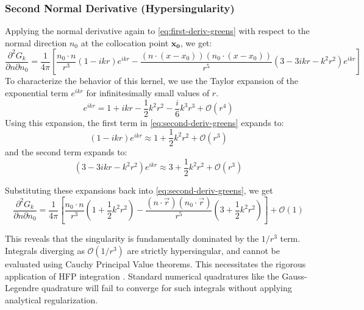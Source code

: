 \subsubsection{Second Normal Derivative (Hypersingularity)} \label{subsubsec:second-normal-derivative}
Applying the normal derivative again to \eqref{eq:first-deriv-greens} with respect to the normal direction $n_0$ at the collocation point $\mathbf{x_0}$, we get:
\begin{equation} \label{eq:second-deriv-greens}
    \frac{\partial^2 G_k}{\partial n \partial n_0} =  \frac{1}{4\pi} \left[\frac{n_0 \cdot n}{r^3}(1 - ikr)e^{ikr} - \frac{(n \cdot (x - x_0))(n_0 \cdot (x - x_0))}{r^5}(3 - 3ikr - k^2 r^2)e^{ikr} \right] 
\end{equation}
To characterize the behavior of this kernel, we use the Taylor expansion of the exponential term $e^{ikr}$ for infinitesimally small values of $r$.
\begin{equation}
    e^{ikr} = 1 + ikr - \frac{1}{2} k^2 r^2 - \frac{i}{6} k^3 r^3 + \mathcal{O}(r^4)
\end{equation}
Using this expansion, the first term in \eqref{eq:second-deriv-greens} expands to:
\begin{equation}
    (1 - ikr)e^{ikr} \approx 1 + \frac{1}{2} k^2 r^2 + \mathcal{O}(r^3)
\end{equation}
and the second term expands to:
\begin{equation}
    (3 - 3ikr - k^2 r^2)e^{ikr} \approx 3 + \frac{1}{2} k^2 r^2 + \mathcal{O}(r^3)
\end{equation}

Substituting these expansions back into \eqref{eq:second-deriv-greens}, we get
\begin{equation}
    \frac{\partial^2 G_k}{\partial n \partial n_0} =  \frac{1}{4\pi} \left[\frac{n_0 \cdot n}{r^3} \left( 1 + \frac{1}{2} k^2 r^2\right) - \frac{(n \cdot \vec{r})(n_0 \cdot \vec{r})}{r^5} \left( 3 + \frac{1}{2} k^2 r^2 \right) \right] + \mathcal{O}(1)
\end{equation} \cite{sunnonsingularburtonmiller2023}

This reveals that the singularity is fundamentally dominated by the $1/r^3$ term.
Integrals diverging as $\mathcal{O}(1/r^3)$ are strictly hypersingular, and cannot be evaluated using Cauchy Principal Value theorems. This necessitates the rigorous application of \ac{HFP} integration \cite{martinhypersingularintegralshow1996}. Standard numerical quadratures like the Gauss-Legendre quadrature will fail to converge for such integrals without applying analytical regularization.

